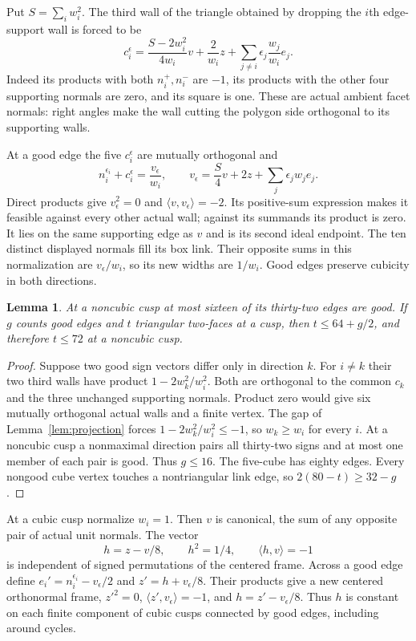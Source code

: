 \documentclass[11pt]{article}
\newtheorem{lemma}[theorem]{Lemma}
\theoremstyle{remark}
\newcommand{\ip}[2]{\langle #1,#2\rangle}
\begin{document}
Put $S=\sum_iw_i^2$. The third wall of the triangle obtained by dropping
the $i$th edge-support wall is forced to be
\begin{equation}\label{eq:thirdwall}
 c_i^\epsilon=\frac{S-2w_i^2}{4w_i}v+\frac2{w_i}z
       +\sum_{j\ne i}\epsilon_j\frac{w_j}{w_i}e_j.
\end{equation}
Indeed its products with both $n_i^+,n_i^-$ are $-1$, its products with
the other four supporting normals are zero, and its square is one.
These are actual ambient facet normals: right angles make the wall
cutting the polygon side orthogonal to its supporting walls.

At a good edge the five $c_i^\epsilon$ are mutually orthogonal and
\begin{equation}\label{eq:endpoint}
 n_i^{\epsilon_i}+c_i^\epsilon=\frac{v_\epsilon}{w_i},\qquad
 v_\epsilon=\frac S4v+2z+\sum_j\epsilon_jw_je_j.
\end{equation}
Direct products give $v_\epsilon^2=0$ and
$\ip{v}{v_\epsilon}=-2$. Its positive-sum expression makes it feasible
against every other actual wall; against its summands its product is
zero. It lies on the same supporting edge as $v$ and is its second
ideal endpoint. The ten distinct displayed normals fill its box link.
Their opposite sums in this normalization are $v_\epsilon/w_i$, so its
new widths are $1/w_i$. Good edges preserve cubicity in both directions.

\begin{lemma}\label{lem:goodedge}
At a noncubic cusp at most sixteen of its thirty-two edges are good.
If $g$ counts good edges and $t$ triangular two-faces at a cusp, then
$t\le64+g/2$, and therefore $t\le72$ at a noncubic cusp.
\end{lemma}
\begin{proof}
Suppose two good sign vectors differ only in direction $k$. For $i\ne k$
their two third walls have product $1-2w_k^2/w_i^2$. Both are
orthogonal to the common $c_k$ and the three unchanged supporting
normals. Product zero would give six mutually orthogonal actual walls
and a finite vertex. The gap of Lemma~\ref{lem:projection} forces
$1-2w_k^2/w_i^2\le-1$, so $w_k\ge w_i$ for every $i$.
At a noncubic cusp a nonmaximal direction pairs all thirty-two signs
and at most one member of each pair is good. Thus $g\le16$.
The five-cube has eighty edges. Every nongood cube vertex touches a
nontriangular link edge, so $2(80-t)\ge32-g$.
\end{proof}

At a cubic cusp normalize $w_i=1$. Then $v$ is canonical, the sum of
any opposite pair of actual unit normals. The vector
\[
 h=z-v/8,\qquad h^2=1/4,\qquad \ip{h}{v}=-1
\]
is independent of signed permutations of the centered frame. Across a
good edge define $e_i'=n_i^{\epsilon_i}-v_\epsilon/2$ and
$z'=h+v_\epsilon/8$. Their products give a new centered orthonormal
frame, $z'^2=0$, $\ip{z'}{v_\epsilon}=-1$, and
$h=z'-v_\epsilon/8$. Thus $h$ is constant on each finite component
of cubic cusps connected by good edges, including around cycles.
\end{document}
